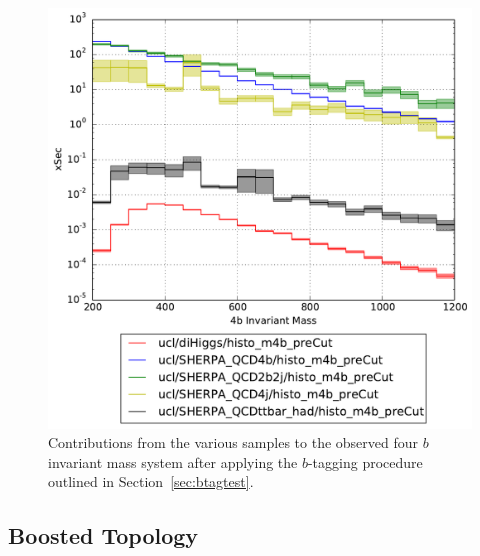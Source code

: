 \documentclass[12pt]{article}
\begin{document}
\begin{figure}[h]
\begin{center}
\includegraphics[width=\textwidth]{plots/m4b_ucl_preCut.pdf}
\caption{Contributions from the various samples to the observed four $b$ invariant mass system after applying the $b$-tagging procedure outlined in Section~\ref{sec:btagtest}.}
\end{center}
\end{figure}

\subsection{Boosted Topology}\label{sec:Boosted_FR}
\end{document}
